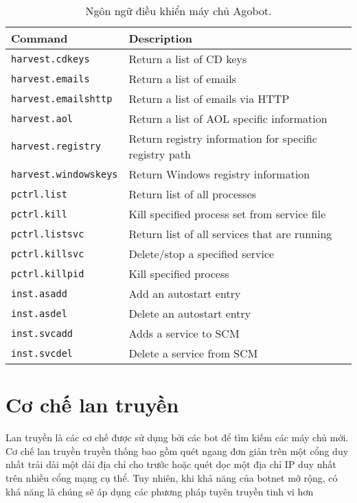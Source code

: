 \begin{table}[ht!]
	\caption{Ngôn ngữ điều khiển máy chủ Agobot.}
	\label{table:botctrl}
	\centering
	\footnotesize
	\begin{tabular}{l l}
		\toprule
		\textbf{Command} &
		\textbf{Description} \\
		\midrule
		\texttt{harvest.cdkeys} & Return a list of CD keys \\
		\texttt{harvest.emails} & Return a list of emails \\
		\texttt{harvest.emailshttp} & Return a list of emails via HTTP \\
		\texttt{harvest.aol} & Return a list of AOL specific information \\
		\texttt{harvest.registry} & Return registry information for specific registry path \\
		\texttt{harvest.windowskeys} & Return Windows registry information \\
		\texttt{pctrl.list} & Return list of all processes \\
		\texttt{pctrl.kill} & Kill specified process set from service file \\
		\texttt{pctrl.listsvc} & Return list of all services that are running \\
		\texttt{pctrl.killsvc} & Delete/stop a specified service \\
		\texttt{pctrl.killpid} & Kill specified process \\
		\texttt{inst.asadd} & Add an autostart entry \\
		\texttt{inst.asdel} & Delete an autostart entry \\
		\texttt{inst.svcadd} & Adds a service to SCM \\
		\texttt{inst.svcdel} & Delete a service from SCM \\
		\bottomrule
	\end{tabular}
\end{table}

\section{Cơ chế lan truyền}
Lan truyền là các cơ chế được sử dụng bởi các bot để tìm kiếm các máy chủ mới.
Cơ chế lan truyền truyền thống bao gồm quét ngang đơn giản trên một cổng duy nhất
trải dài một dải địa chỉ cho trước hoặc quét dọc một địa chỉ IP duy nhất trên nhiều cổng mạng cụ thể.
Tuy nhiên, khi khả năng của botnet mở rộng, có khả năng là chúng sẽ áp dụng các phương pháp tuyên truyền tinh vi hơn

